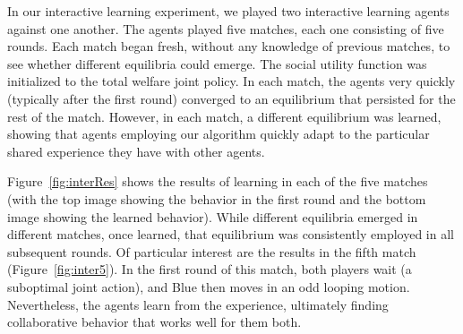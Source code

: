 In our interactive learning experiment,
we played two interactive learning agents against one another.  The
agents played five matches, each one consisting of five rounds.  Each
match began fresh, without any knowledge of previous matches, to see
whether different equilibria could emerge.  The social utility function was
initialized to the total welfare joint policy.  In each match, the
agents very quickly (typically after the first round) converged to an
equilibrium that persisted for the rest of the match.  However, in each
match, a different equilibrium was learned, showing that agents employing our
algorithm quickly adapt to the particular shared experience they have
with other agents.

Figure~\ref{fig:interRes} shows the results of learning in each of the
five matches (with the top image showing the behavior in the first
round and the bottom image showing the learned behavior). While
different equilibria emerged in different matches, once learned, that
equilibrium was consistently employed in all subsequent rounds.  Of
particular interest are the results in the fifth match
(Figure~\ref{fig:inter5}). In the first round of this match, both
players wait (a suboptimal joint action), and Blue then moves in an
odd looping motion. Nevertheless, the agents learn from the experience,
ultimately finding collaborative behavior that works well for them both.


